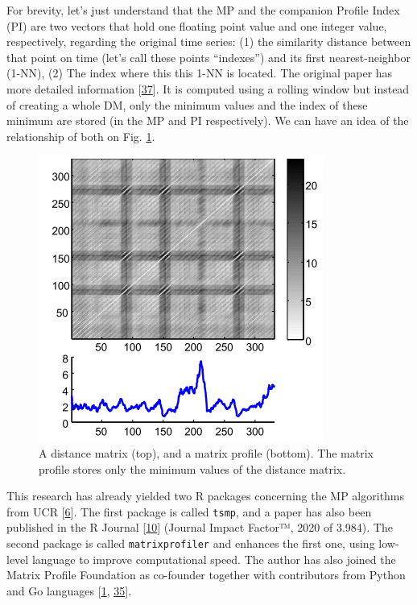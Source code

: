 \documentclass[runningheads]{llncs}
\begin{document}
For brevity, let's just understand that the MP and the companion Profile Index (PI) are two vectors
that hold one floating point value and one integer value, respectively, regarding the original time
series: (1) the similarity distance between that point on time (let's call these points ``indexes'')
and its first nearest-neighbor (1-NN), (2) The index where this this 1-NN is located. The original
paper has more detailed information {[}\protect\hyperlink{ref-Yeh2017a}{37}{]}. It is computed using a rolling window but instead
of creating a whole DM, only the minimum values and the index of these minimum are stored (in the
MP and PI respectively). We can have an idea of the relationship of both on Fig. \ref{fig:thematrix}.

\begin{figure}

{\centering \includegraphics{../../docs/figure/mp_1} 

}

\caption{A distance matrix (top), and a matrix profile (bottom). The matrix profile stores only the minimum values of the distance matrix.}\label{fig:thematrix}
\end{figure}

This research has already yielded two R packages concerning the MP algorithms from UCR {[}\protect\hyperlink{ref-mpucr}{6}{]}. The
first package is called \texttt{tsmp}, and a paper has also been published in the R Journal {[}\protect\hyperlink{ref-RJ-2020-021}{10}{]}
(Journal Impact Factor™, 2020 of 3.984). The second package is called \texttt{matrixprofiler} and enhances
the first one, using low-level language to improve computational speed. The author has also joined
the Matrix Profile Foundation as co-founder together with contributors from Python and Go languages
{[}\protect\hyperlink{ref-mpf2020}{1}, \protect\hyperlink{ref-VanBenschoten2020}{35}{]}.
\end{document}

